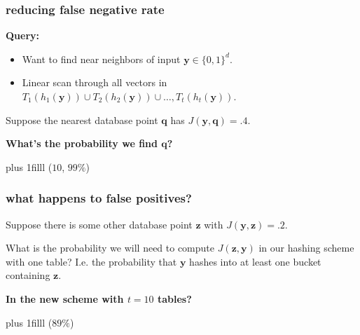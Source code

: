 \documentclass[compress]{beamer}
\newcommand{\bv}[1]{\mathbf{#1}}
\begin{document}
\begin{frame}[t]
	\frametitle{reducing false negative rate}
	\textbf{Query:}
	\begin{itemize}
		\item Want to find near neighbors of input $\bv{y}\in\{0,1\}^d$.
		\item Linear scan through all vectors in $T_1(h_1(\bv{y}))\cup T_2(h_2(\bv{y}))\cup \ldots, T_t(h_t(\bv{y}))$.
	\end{itemize}

\vspace{2em}
	Suppose the nearest database point $\bv{q}$ has $J(\bv{y},\bv{q}) = .4$.
	\begin{center}
		\textbf{\alert{What's the probability we find $\bv{q}$?}}
	\end{center}
	
	\vskip0pt plus 1filll
	\hspace{-1em}\scriptsize($10$, $99\%$)
\end{frame}

\begin{frame}[t]
	\frametitle{what happens to false positives?}
	Suppose there is some other database point $\bv{z}$ with $J(\bv{y},\bv{z}) = .2$. 
	
	What is the probability we will need to compute $J(\bv{z},\bv{y})$ in our hashing scheme with one table? I.e. the probability that $\bv{y}$ hashes into at least one bucket containing $\bv{z}$. 
	
	\vspace{4em}
	{\textbf{\alert{In the new scheme with $t=10$ tables?}}}
	
	\vskip0pt plus 1filll
	\hspace{-1em}\scriptsize($89\%$)
\end{frame}
\end{document}

